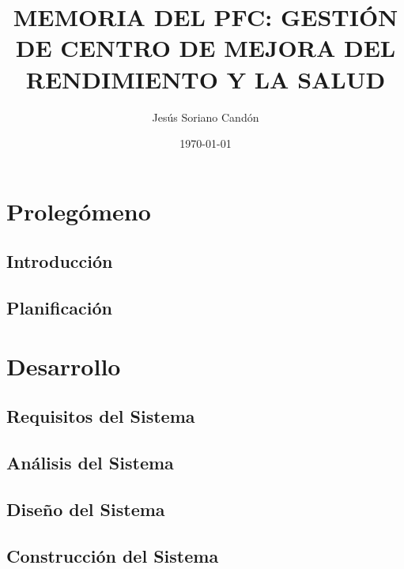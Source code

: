 \documentclass[a4paper,11pt]{book}
\title{MEMORIA DEL PFC: GESTIÓN DE CENTRO DE MEJORA DEL RENDIMIENTO Y LA SALUD}
\author{Jesús Soriano Candón}
\date{\today}
\begin{document}
\pagestyle{plain}


\cleardoublepage


\cleardoublepage


\newpage


\newpage


\frontmatter

\tableofcontents
\listoffigures
\listoftables

\mainmatter

\part{Prolegómeno}
\null\vfill

\chapter{Introducción}


\chapter{Planificación}


\part{Desarrollo}
\null\vfill

\chapter{Requisitos del Sistema}


\chapter{Análisis del Sistema}
%

\chapter{Diseño del Sistema}


\chapter{Construcción del Sistema}

\end{document}
